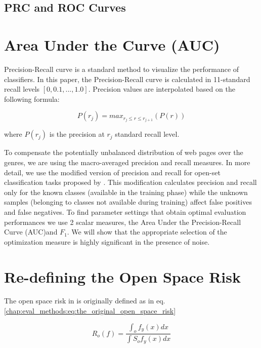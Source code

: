 \subsection{PRC and ROC Curves}\label{chap:eval_methods:sec:roc_prc}



\section{Area Under the Curve (AUC)}\label{chap:eval_methods:sec:closed_set_classification} 

Precision-Recall curve is a standard method to visualize the performance of classifiers. In this paper, the Precision-Recall curve is calculated in 11-standard recall levels $[0,0.1,...,1.0]$. Precision values are interpolated based on the following formula:

\begin{equation}
	P(r_j)=max_{r_j \leqslant r \leqslant r_{j+1}}(P(r))
\end{equation}

\noindent
where $P(r_j)$ is the precision at $r_j$ standard recall level.


To compensate the potentially unbalanced distribution of web pages over the genres, we are using the macro-averaged precision and recall measures. In more detail, we use the modified version of precision and recall for open-set classification tasks proposed by \parencite{mendesjunior2016}. This modification calculates precision and recall only for the known classes (available in the training phase) while the unknown samples (belonging to classes not available during training) affect false positives and false negatives. To find parameter settings that obtain optimal evaluation performances we use 2 scalar measures, the Area Under the Precision-Recall Curve (AUC)and $F_{1}$. We will show that the appropriate selection of the optimization measure is highly significant in the presence of noise.


\section{Re-defining the Open Space Risk}\label{chap:eval_methods:sec:open_space_risk} 

The open space risk in \parencite{scheirer2013toward} is originally defined as in eq. \ref{chap:eval_methods:eq:the_original_open_space_risk}

\begin{equation}\label{chap:eval_methods:eq:the_original_open_space_risk}
	R_{o}(f) = \frac{\int_{o} f_{y}(x) dx}{\int{S_{o}}  f_{y}(x) dx}

\end{equation}

